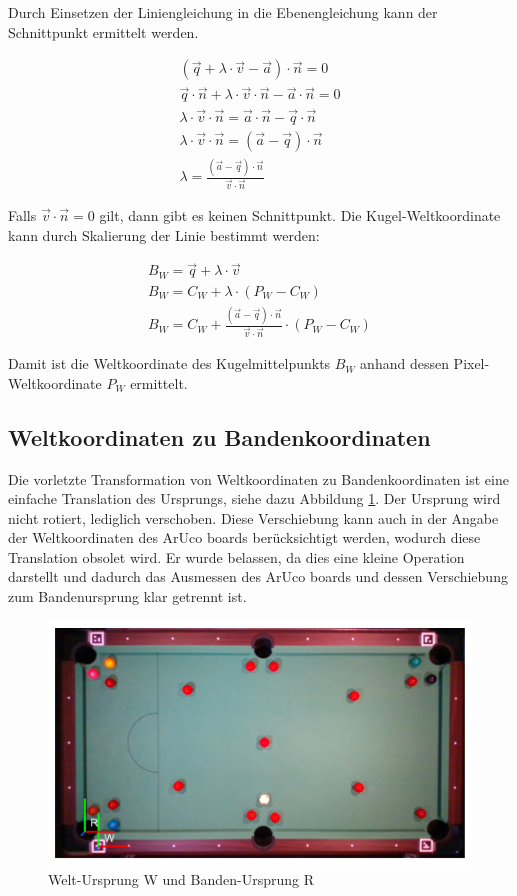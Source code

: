 Durch Einsetzen der Liniengleichung in die Ebenengleichung kann der Schnittpunkt ermittelt werden.

\begin{align}
(\vec{q} + \lambda \cdot \vec{v} - \vec{a}) \cdot \vec{n} = 0\\
\vec{q} \cdot \vec{n} + \lambda \cdot \vec{v} \cdot \vec{n} - \vec{a} \cdot \vec{n} = 0\\
\lambda \cdot \vec{v} \cdot \vec{n} = \vec{a} \cdot \vec{n} - \vec{q} \cdot \vec{n}\\
\lambda \cdot \vec{v} \cdot \vec{n} = (\vec{a} - \vec{q}) \cdot \vec{n}\\
\lambda = \frac{(\vec{a} - \vec{q}) \cdot \vec{n}}{\vec{v} \cdot \vec{n}}
\end{align}

Falls $\vec{v} \cdot \vec{n} = 0$ gilt, dann gibt es keinen Schnittpunkt.
Die Kugel-Weltkoordinate kann durch Skalierung der Linie bestimmt werden:

\begin{align}
B_W = \vec{q} + \lambda \cdot \vec{v}\\
B_W = C_W + \lambda \cdot (P_W - C_W)\\
B_W = C_W + \frac{(\vec{a} - \vec{q}) \cdot \vec{n}}{\vec{v} \cdot \vec{n}} \cdot (P_W - C_W)
\end{align}

Damit ist die Weltkoordinate des Kugelmittelpunkts $B_W$ anhand dessen Pixel-Weltkoordinate $P_W$ ermittelt.


\subsection{Weltkoordinaten zu Bandenkoordinaten}\label{kap:world_to_rail}

Die vorletzte Transformation von Weltkoordinaten zu Bandenkoordinaten ist eine einfache Translation des Ursprungs,
siehe dazu Abbildung \ref{fig:table_world_to_rail}. Der Ursprung wird nicht rotiert, lediglich verschoben.
Diese Verschiebung kann auch in der Angabe der Weltkoordinaten des ArUco boards berücksichtigt werden, wodurch diese
Translation obsolet wird. Er wurde belassen, da dies eine kleine Operation darstellt und dadurch das Ausmessen des
ArUco boards und dessen Verschiebung zum Bandenursprung klar getrennt ist.

\begin{figure}[h!]
    \begin{center}
    \includegraphics[width=0.6\linewidth]{../common/resources/coordinate_systems/table_world_to_rail.png}
    \end{center}
    \caption{Welt-Ursprung W und Banden-Ursprung R}
    \label{fig:table_world_to_rail}
\end{figure}

